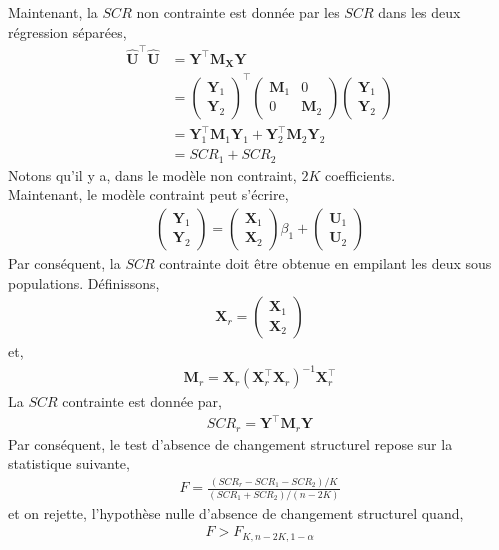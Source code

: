 Maintenant, la $SCR$ non contrainte est donnée par les $SCR$ dans les deux régression séparées,
\begin{align*}
\widehat{\mathbf{U}}^\top\widehat{\mathbf{U}} &= \mathbf{Y}^\top\mathbf{M}_\mathbf{X}\mathbf{Y}\\
&=
\left(
\begin{array}{c}
\mathbf{Y}_1\\
\mathbf{Y}_2
\end{array}
\right)^\top
\left(
\begin{array}{cc}
\mathbf{M}_1&0\\
0&\mathbf{M}_2
\end{array}
\right)
\left(
\begin{array}{c}
\mathbf{Y}_1\\
\mathbf{Y}_2
\end{array}
\right)
\\
&= \mathbf{Y}_1^\top\mathbf{M}_1\mathbf{Y}_1 + \mathbf{Y}_2^\top\mathbf{M}_2\mathbf{Y}_2\\
&=SCR_1 +SCR_2
\end{align*}
Notons qu'il y a, dans le modèle non contraint, $2K$ coefficients.\\
Maintenant, le modèle contraint peut s'écrire,
\begin{align}
\left(
\begin{array}{c}
\mathbf{Y}_1\\
\mathbf{Y}_2
\end{array}
\right)
=
\left(
\begin{array}{c}
\mathbf{X}_1\\
\mathbf{X}_2
\end{array}
\right)\beta_1
+
\left(
\begin{array}{c}
\mathbf{U}_1\\
\mathbf{U}_2
\end{array}
\right)
\label{eq52}
\end{align}
Par conséquent, la $SCR$ contrainte doit être obtenue en empilant les deux sous populations. Définissons,
\begin{align*}
\mathbf{X}_r = \left(\begin{array}{c}
\mathbf{X}_1\\
\mathbf{X}_2
\end{array}\right)
\end{align*}
et,
\begin{align*}
\mathbf{M}_r = \mathbf{X}_r(\mathbf{X}_r^\top\mathbf{X}_r)^{-1}\mathbf{X}_r^\top
\end{align*}
La $SCR$ contrainte est donnée par,
\begin{align*}
SCR_r = \mathbf{Y}^\top\mathbf{M}_r\mathbf{Y}
\end{align*}
Par conséquent, le test d'absence de changement structurel repose sur la statistique suivante,
\begin{align*}
F = \frac{(SCR_r - SCR_1 - SCR_2)/K}{(SCR_1 + SCR_2)/(n-2K)}
\end{align*}
et on rejette, l'hypothèse nulle d'absence de changement structurel quand,
\begin{align*}
F > F_{K, n-2K, 1-\alpha}
\end{align*}

